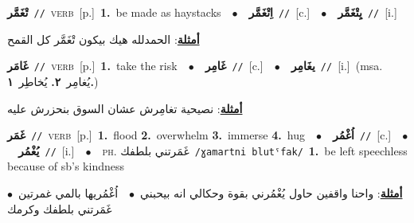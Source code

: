 \documentclass[10pt,a4paper,twoside]{article} %
\begin{document}
\begin{multicols}{2}
{\setlength\topsep{0pt}\textbf{\foreignlanguage{arabic}{تْغَمَّر}}\ {\color{gray}\texttt{//}\color{black}}\ \textsc{verb}\ [p.]\ \textbf{1.}~be made as haystacks\ \ $\bullet$\ \ \setlength\topsep{0pt}\textbf{\foreignlanguage{arabic}{اِتْغَمَّر}}\ {\color{gray}\texttt{//}\color{black}}\ [c.]\ \ $\bullet$\ \ \setlength\topsep{0pt}\textbf{\foreignlanguage{arabic}{يِتْغَمَّر}}\ {\color{gray}\texttt{//}\color{black}}\ [i.]\  \begin{flushright}\color{gray}\foreignlanguage{arabic}{\textbf{\underline{\foreignlanguage{arabic}{أمثلة}}}: الحمدلله هيك بيكون تْغَمَّر كل القمح}\end{flushright}\color{black}} \vspace{2mm}

{\setlength\topsep{0pt}\textbf{\foreignlanguage{arabic}{غَامَر}}\ {\color{gray}\texttt{//}\color{black}}\ \textsc{verb}\ [p.]\ \textbf{1.}~take the risk\ \ $\bullet$\ \ \setlength\topsep{0pt}\textbf{\foreignlanguage{arabic}{غَامِر}}\ {\color{gray}\texttt{//}\color{black}}\ [c.]\ \ $\bullet$\ \ \setlength\topsep{0pt}\textbf{\foreignlanguage{arabic}{يغَامِر}}\ {\color{gray}\texttt{//}\color{black}}\ [i.]\ \color{gray}(msa. \foreignlanguage{arabic}{يُغامِر}~\foreignlanguage{arabic}{\textbf{٢.}}  \foreignlanguage{arabic}{يُخاطِر}~\foreignlanguage{arabic}{\textbf{١.}})\color{black}\  \begin{flushright}\color{gray}\foreignlanguage{arabic}{\textbf{\underline{\foreignlanguage{arabic}{أمثلة}}}: نصيحية تغامِرش عشان السوق بنحزرش عليه}\end{flushright}\color{black}} \vspace{2mm}

{\setlength\topsep{0pt}\textbf{\foreignlanguage{arabic}{غَمَر}}\ {\color{gray}\texttt{//}\color{black}}\ \textsc{verb}\ [p.]\ \textbf{1.}~flood  \textbf{2.}~overwhelm  \textbf{3.}~immerse  \textbf{4.}~hug\ \ $\bullet$\ \ \setlength\topsep{0pt}\textbf{\foreignlanguage{arabic}{اُغْمُر}}\ {\color{gray}\texttt{//}\color{black}}\ [c.]\ \ $\bullet$\ \ \setlength\topsep{0pt}\textbf{\foreignlanguage{arabic}{يُغْمُر}}\ {\color{gray}\texttt{//}\color{black}}\ [i.]\ \ $\bullet$\ \ \textsc{ph.} \color{gray} \foreignlanguage{arabic}{غَمَرتني بلطفك}\color{black}\ {\color{gray}\texttt{/{\sffamily ɣamartni blutˤfak}/}\color{black}}\ \textbf{1.}~be left speechless because of sb's kindness\  \begin{flushright}\color{gray}\foreignlanguage{arabic}{\textbf{\underline{\foreignlanguage{arabic}{أمثلة}}}: واحنا واقفين حاول يُغْمُرني بقوة وحكالي انه بيحبني\ $\bullet$\ \  اُغْمُريها بالمي غمرتين\ $\bullet$\ \  غَمَرتني بلطفك وكرمك}\end{flushright}\color{black}} \vspace{2mm}


\end{multicols}
\end{document}
